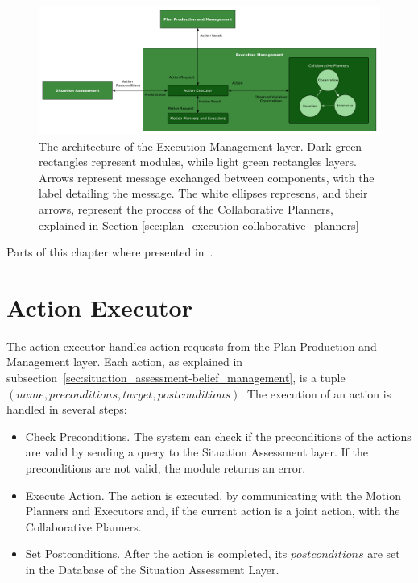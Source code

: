 \begin{figure}[h!]
	\centering
	\includegraphics[clip,scale=0.38]{img/plan_execution/architecture.pdf}
	\caption[The architecture of the Execution Management layer]{The architecture of the Execution Management layer. Dark green rectangles represent modules, while light green rectangles layers. Arrows represent message exchanged between components, with the label detailing the message. The white ellipses represens, and their arrows, represent the process of the Collaborative Planners, explained in Section \ref{sec:plan_execution-collaborative_planners} }
	\label{fig:plan_execution:architecture}
\end{figure}



Parts of this chapter where presented in~\cite{fioreiser2014}.

\section{Action Executor}
\label{sec:plan_execution-action_executor}
The action executor handles action requests from the Plan Production and Management layer. Each action, as explained in subsection~\ref{sec:situation_assessment-belief_management}, is a tuple $(name, preconditions, target, postconditions)$. The execution of an action is handled in several steps:
\begin{itemize}
\item Check Preconditions. The system can check if the preconditions of the actions are valid by sending a query to the Situation Assessment layer. If the preconditions are not valid, the module returns an error.
\item Execute Action. The action is executed, by communicating with the Motion Planners and Executors and, if the current action is a joint action, with the Collaborative Planners.
\item Set Postconditions. After the action is completed, its $postconditions$ are set in the Database of the Situation Assessment Layer.
\end{itemize}

